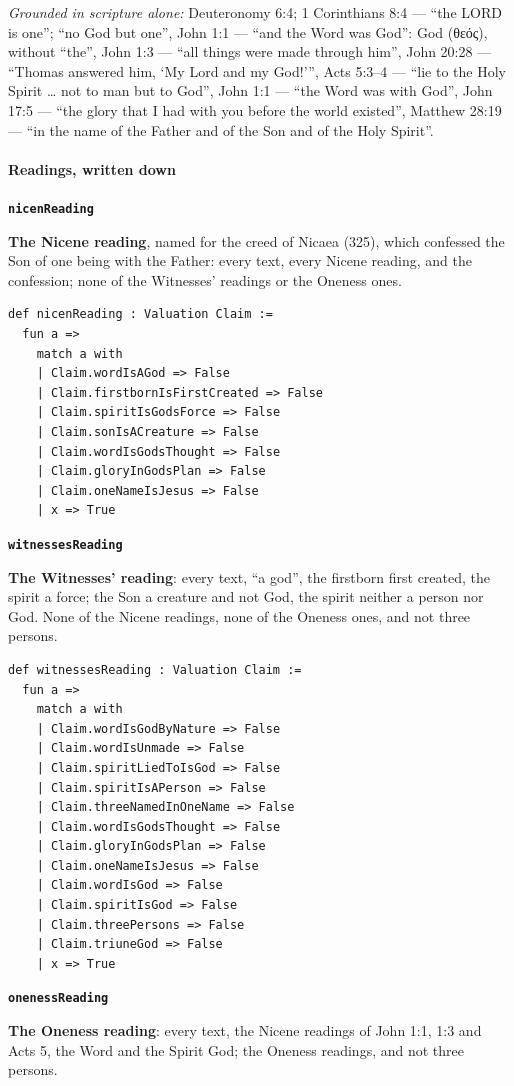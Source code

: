 \documentclass[11pt,paper=\testimonypaper,DIV=13,parskip=false]{scrartcl}
\begin{document}
\emph{Grounded in scripture alone:} Deuteronomy 6:4; 1 Corinthians 8:4 — “the LORD is one”; “no God but one”, John 1:1 — “and the Word was God”: God (θεός), without “the”, John 1:3 — “all things were made through him”, John 20:28 — “Thomas answered him, ‘My Lord and my God!’”, Acts 5:3–4 — “lie to the Holy Spirit … not to man but to God”, John 1:1 — “the Word was with God”, John 17:5 — “the glory that I had with you before the world existed”, Matthew 28:19 — “in the name of the Father and of the Son and of the Holy Spirit”.
\paragraph*{Readings, written down}
\leavevmode\par\nobreak
\par\medskip\noindent\textbf{\texttt{nicen\allowbreak{}Reading}}\par\nobreak\noindent
\textbf{The Nicene reading}, named for the creed of Nicaea (325), which confessed the Son of one being with the Father: every text, every Nicene reading, and the confession; none of the Witnesses’ readings or the Oneness ones.

{\small\begin{verbatim}
def nicenReading : Valuation Claim :=
  fun a =>
    match a with
    | Claim.wordIsAGod => False
    | Claim.firstbornIsFirstCreated => False
    | Claim.spiritIsGodsForce => False
    | Claim.sonIsACreature => False
    | Claim.wordIsGodsThought => False
    | Claim.gloryInGodsPlan => False
    | Claim.oneNameIsJesus => False
    | x => True
\end{verbatim}}
\par\medskip\noindent\textbf{\texttt{witnesses\allowbreak{}Reading}}\par\nobreak\noindent
\textbf{The Witnesses’ reading}: every text, “a god”, the firstborn first created, the spirit a force; the Son a creature and not God, the spirit neither a person nor God. None of the Nicene readings, none of the Oneness ones, and not three persons.

{\small\begin{verbatim}
def witnessesReading : Valuation Claim :=
  fun a =>
    match a with
    | Claim.wordIsGodByNature => False
    | Claim.wordIsUnmade => False
    | Claim.spiritLiedToIsGod => False
    | Claim.spiritIsAPerson => False
    | Claim.threeNamedInOneName => False
    | Claim.wordIsGodsThought => False
    | Claim.gloryInGodsPlan => False
    | Claim.oneNameIsJesus => False
    | Claim.wordIsGod => False
    | Claim.spiritIsGod => False
    | Claim.threePersons => False
    | Claim.triuneGod => False
    | x => True
\end{verbatim}}
\par\medskip\noindent\textbf{\texttt{oneness\allowbreak{}Reading}}\par\nobreak\noindent
\textbf{The Oneness reading}: every text, the Nicene readings of John 1:1, 1:3 and Acts 5, the Word and the Spirit God; the Oneness readings, and not three persons.
\end{document}
